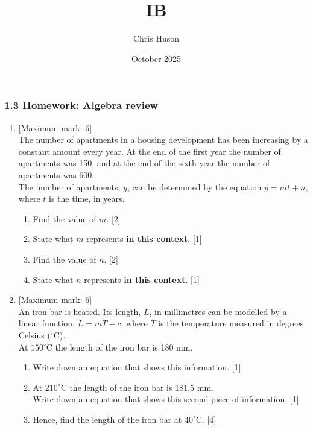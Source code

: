 \documentclass[12pt, twoside]{article}
\title{IB}
\author{Chris Huson}
\date{October 2025}
\begin{document}
\subsubsection*{1.3 Homework: Algebra review}
\begin{enumerate}[itemsep=0.5cm]
\item {[Maximum mark: 6]} \\[0.3cm]
    The number of apartments in a housing development has been increasing by a constant amount every year. At the end of the first year the number of apartments was 150, and at the end of the sixth year the number of apartments was 600. \\[0.25cm]
    The number of apartments, $y$, can be determined by the equation $y=mt+n$, where $t$ is the time, in years.
    \begin{enumerate}[itemsep=0.25cm]
        \item Find the value of $m$. \hfill [2]
        \item State what $m$ represents \textbf{in this context}. \hfill [1]
        \item Find the value of $n$. \hfill [2]
        \item State what $n$ represents \textbf{in this context}. \hfill [1]
    \end{enumerate}

\newpage
\item {[Maximum mark: 6]} \\[0.3cm]
    An iron bar is heated. Its length, $L$, in millimetres can be modelled by a linear function, $L=mT+c$, where $T$ is the temperature measured in degrees Celsius ($^\circ$C). \\[0.25cm]
    At $150^\circ$C the length of the iron bar is 180 mm.
    \begin{enumerate}[itemsep=0.25cm]
        \item Write down an equation that shows this information. \hfill [1]
        \item At $210^\circ$C the length of the iron bar is 181.5 mm. \\[0.25cm]
        Write down an equation that shows this second piece of information. \hfill [1]
        \item Hence, find the length of the iron bar at $40^\circ$C. \hfill [4]
    \end{enumerate}


\end{enumerate}
\end{document}
